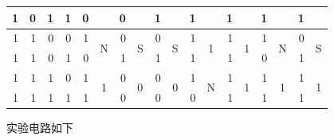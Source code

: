 \documentclass[11pt,UTF8]{ctexart}
\begin{document}
\begin{table}[H]
\begin{tabular}{|r|r|r|r|r|c|r|c|r|c|r|c|r|c|r|c|r|c|}
\cline{1-5}\cline{7-7}\cline{9-9}\cline{11-11}\cline{13-13}\cline{15-15}\cline{17-17}    1     & 0     & 1     & 1     & 0     &       & 0     &       & \textcolor[rgb]{ 1,  0,  0}{1} &       & \textcolor[rgb]{ 1,  0,  0}{1} &       & \textcolor[rgb]{ 1,  0,  0}{1} &       & \textcolor[rgb]{ 1,  0,  0}{1} &       & \textcolor[rgb]{ 1,  0,  0}{1} &  \bigstrut\\
    \hline
    1     & 1     & 0     & 0     & \textcolor[rgb]{ 1,  0,  0}{1} & \multirow{2}[4]{*}{N} & 0     & \multirow{2}[4]{*}{S} & 0     & \multirow{2}[4]{*}{S} & \textcolor[rgb]{ 1,  0,  0}{1} & \multirow{2}[4]{*}{1} & \textcolor[rgb]{ 1,  0,  0}{1} & \multirow{2}[4]{*}{1} & \textcolor[rgb]{ 1,  0,  0}{1} & \multirow{2}[4]{*}{N} & 0     & \multirow{2}[4]{*}{S} \bigstrut\\
\cline{1-5}\cline{7-7}\cline{9-9}\cline{11-11}\cline{13-13}\cline{15-15}\cline{17-17}    1     & 1     & 0     & 1     & 0     &       & \textcolor[rgb]{ 1,  0,  0}{1} &       & \textcolor[rgb]{ 1,  0,  0}{1} &       & \textcolor[rgb]{ 1,  0,  0}{1} &       & \textcolor[rgb]{ 1,  0,  0}{1} &       & 0     &       & \textcolor[rgb]{ 1,  0,  0}{1} &  \bigstrut\\
    \hline
    1     & 1     & 1     & 0     & \textcolor[rgb]{ 1,  0,  0}{1} & \multirow{2}[4]{*}{1} & 0     & \multirow{2}[4]{*}{0} & 0     & \multirow{2}[4]{*}{0} & \textcolor[rgb]{ 1,  0,  0}{1} & \multirow{2}[4]{*}{N} & \textcolor[rgb]{ 1,  0,  0}{1} & \multirow{2}[4]{*}{1} & \textcolor[rgb]{ 1,  0,  0}{1} & \multirow{2}[4]{*}{1} & \textcolor[rgb]{ 1,  0,  0}{1} & \multirow{2}[4]{*}{1} \bigstrut\\
\cline{1-5}\cline{7-7}\cline{9-9}\cline{11-11}\cline{13-13}\cline{15-15}\cline{17-17}    1     & 1     & 1     & 1     & \textcolor[rgb]{ 1,  0,  0}{1} &       & 0     &       & 0     &       & 0     &       & \textcolor[rgb]{ 1,  0,  0}{1} &       & \textcolor[rgb]{ 1,  0,  0}{1} &       & \textcolor[rgb]{ 1,  0,  0}{1} &  \bigstrut\\
    \hline
    \end{tabular}%
  \label{tab:addlabel}%
\end{table}%
\par 实验电路如下
\end{document}

